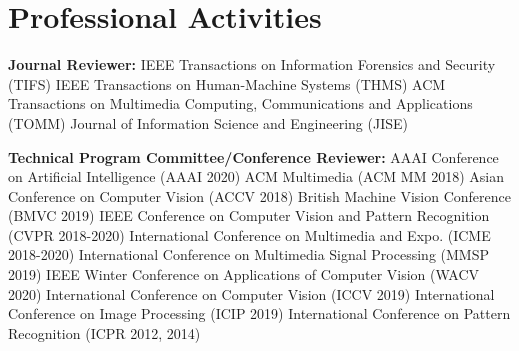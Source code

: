 \section{Professional Activities}
\textbf{Journal Reviewer:}
\PubItemStart
    \pubitem IEEE Transactions on Information Forensics and Security (TIFS) 
    \pubitem IEEE Transactions on Human-Machine Systems (THMS)
    \pubitem ACM Transactions on Multimedia Computing, Communications and Applications (TOMM)
    \pubitem Journal of Information Science and Engineering (JISE) 
\PubItemEnd

\textbf{Technical Program Committee/Conference Reviewer:}
\PubItemStart
    \pubitem AAAI Conference on Artificial Intelligence (AAAI 2020)
    \pubitem ACM Multimedia (ACM MM 2018) 
    \pubitem Asian Conference on Computer Vision (ACCV 2018) 
    \pubitem British Machine Vision Conference (BMVC 2019)
    \pubitem IEEE Conference on Computer Vision and Pattern Recognition (CVPR 2018-2020) 
    \pubitem International Conference on Multimedia and Expo. (ICME 2018-2020)
    \pubitem International Conference on Multimedia Signal Processing (MMSP 2019)
    \pubitem IEEE Winter Conference on Applications of Computer Vision (WACV 2020)
    \pubitem International Conference on Computer Vision (ICCV 2019)
    \pubitem International Conference on Image Processing (ICIP 2019)
    \pubitem International Conference on Pattern Recognition (ICPR 2012, 2014)
\PubItemEnd
    
